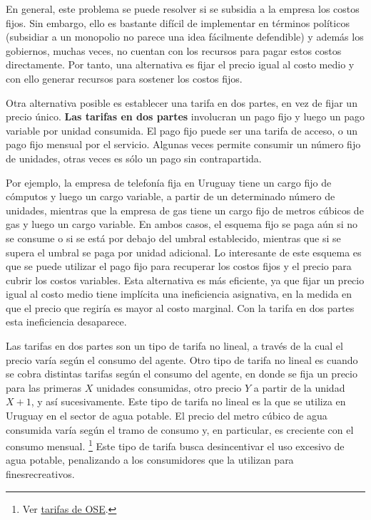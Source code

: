 \documentclass[
  12pt,
  spanish,
]{book}
\begin{document}
En general, este problema se puede resolver si se subsidia a la empresa
los costos fijos. Sin embargo, ello es bastante difícil de implementar
en términos políticos (subsidiar a un monopolio no parece una idea
fácilmente defendible) y además los gobiernos, muchas veces, no cuentan
con los recursos para pagar estos costos directamente. Por tanto, una
alternativa es fijar el precio igual al costo medio y con ello generar
recursos para sostener los costos fijos.

Otra alternativa posible es establecer una tarifa en dos partes, en vez
de fijar un precio único. \textbf{Las tarifas en dos partes} involucran
un pago fijo y luego un pago variable por unidad consumida. El pago fijo
puede ser una tarifa de acceso, o un pago fijo mensual por el servicio.
Algunas veces permite consumir un número fijo de unidades, otras veces
es sólo un pago sin contrapartida.

Por ejemplo, la empresa de telefonía fija en Uruguay tiene un cargo fijo
de cómputos y luego un cargo variable, a partir de un determinado número
de unidades, mientras que la empresa de gas tiene un cargo fijo de
metros cúbicos de gas y luego un cargo variable. En ambos casos, el
esquema fijo se paga aún si no se consume o si se está por debajo del
umbral establecido, mientras que si se supera el umbral se paga por
unidad adicional. Lo interesante de este esquema es que se puede
utilizar el pago fijo para recuperar los costos fijos y el precio para
cubrir los costos variables. Esta alternativa es más eficiente, ya que
fijar un precio igual al costo medio tiene implícita una ineficiencia
asignativa, en la medida en que el precio que regiría es mayor al costo
marginal. Con la tarifa en dos partes esta ineficiencia desaparece.

Las tarifas en dos partes son un tipo de tarifa no lineal, a través de
la cual el precio varía según el consumo del agente. Otro tipo de tarifa
no lineal es cuando se cobra distintas tarifas según el consumo del
agente, en donde se fija un precio para las primeras \(X\) unidades
consumidas, otro precio \(Y\) a partir de la unidad \(X+1\), y así
sucesivamente. Este tipo de tarifa no lineal es la que se utiliza en
Uruguay en el sector de agua potable. El precio del metro cúbico de agua
consumida varía según el tramo de consumo y, en particular, es creciente
con el consumo mensual. \footnote{Ver
  \href{http://www.ose.com.uy/descargas/clientes/tarifas/ose_decreto_tarifario_2019.pdf}{tarifas
  de OSE}.} Este tipo de tarifa busca desincentivar el uso excesivo de
agua potable, penalizando a los consumidores que la utilizan para
finesrecreativos.
\end{document}
